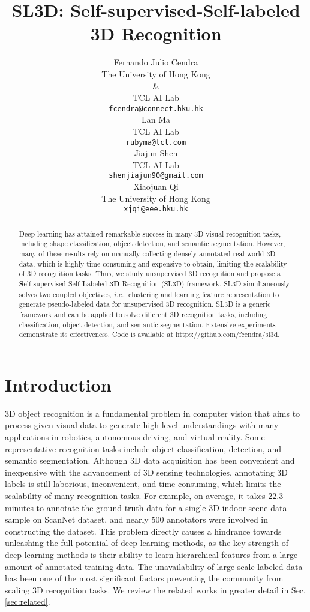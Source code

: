 \documentclass{article}
\title{SL3D: Self-supervised-Self-labeled 3D Recognition}
\author{Fernando Julio Cendra\\
  The University of Hong Kong\\
  \& \\
  TCL AI Lab\\
  \texttt{fcendra@connect.hku.hk}\\
  \And
  Lan Ma\\
  TCL AI Lab\\
  \texttt{rubyma@tcl.com}\\
  \AND
  Jiajun Shen\\
  TCL AI Lab\\
  \texttt{shenjiajun90@gmail.com}\\
  \And
  Xiaojuan Qi\\
  The University of Hong Kong\\
  \texttt{xjqi@eee.hku.hk}\\
}
\begin{document}
\maketitle

\begin{abstract}
Deep learning has attained remarkable success in many 3D visual recognition tasks, including shape classification, object detection, and semantic segmentation.
  However, many of these results rely on manually collecting densely annotated real-world 3D data, which is highly time-consuming and expensive to obtain, limiting the scalability of 3D recognition tasks. Thus, we study unsupervised 3D recognition and propose a \textbf{S}elf-supervised-Self-\textbf{L}abeled \textbf{3D} Recognition (SL3D) framework. SL3D simultaneously solves two coupled objectives, \emph{i.e.,} clustering  and learning feature representation to generate pseudo-labeled data for unsupervised 3D recognition. SL3D is a generic framework and can be applied to solve different 3D recognition tasks, including classification, object detection, and semantic segmentation. Extensive experiments demonstrate its effectiveness. Code is available at \url{https://github.com/fcendra/sl3d}.
\end{abstract}

\section{Introduction}

3D object recognition is a fundamental problem in computer vision that aims to process given visual data to generate high-level understandings with many applications in robotics, autonomous driving, and virtual reality. Some representative recognition tasks include object classification, detection, and semantic segmentation. Although 3D data acquisition has been convenient and inexpensive with the advancement of 3D sensing technologies, annotating 3D labels is still laborious, inconvenient, and time-consuming, which limits the scalability of many recognition tasks. For example, on average, it takes $22.3$ minutes to annotate the ground-truth data for a single 3D indoor scene data sample on ScanNet \cite{dai2017scannet} dataset, and nearly 500 annotators were involved in constructing the dataset. This problem directly causes a hindrance towards unleashing the full potential of deep learning methods, as the key strength of deep learning methods is their ability to learn hierarchical features from a large amount of annotated training data. 
The unavailability of large-scale labeled data has been one of the most significant factors preventing the community from scaling 3D recognition tasks. We review the related works in greater detail in Sec. \ref{sec:related}.
\end{document}
